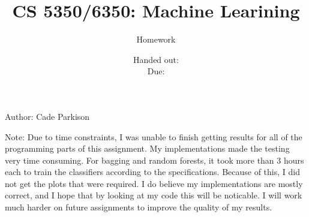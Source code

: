 \documentclass[12pt, fullpage,letterpaper]{article}
\title{CS 5350/6350: Machine Learining \semester}
\author{Homework \assignmentId}
\date{Handed out: \releaseDate\\
	Due: \dueDate}
\begin{document}
\maketitle


{\footnotesize
	Author: Cade Parkison
	
	Note: Due to time constraints, I was unable to finish getting results for all of the programming parts of this assignment. My implementations made the testing very time consuming. For bagging and random forests, it took more than 3 hours each to train the classifiers according to the specifications. Because of this, I did not get the plots that were required. I do believe my implementations are mostly correct, and I hope that by looking at my code this will be noticable. I will work much harder on future assignments to improve the quality of my results. 
}
\end{document}
